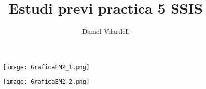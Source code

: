 \documentclass[12pt, a4papre]{article}
\author{Daniel Vilardell}
\title{Estudi previ practica 5 SSIS}
\date{}
\begin{document}
	\begin{figure}[H]
		\begin{center}
		\texttt{[image: GraficaEM2\_1.png]}
		\end{center}
	\end{figure}
	
	\begin{figure}[H]
		\begin{center}
		\texttt{[image: GraficaEM2\_2.png]}
		\end{center}
	\end{figure}
	
	
\end{document}
